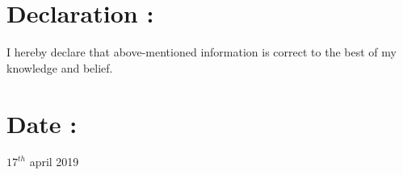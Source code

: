 \documentclass[a4paper, 12 pt]{article}
\begin{document}
\section*{Declaration :}
\hspace{1cm}I hereby declare that above-mentioned information is correct to the best of my \\
\hspace{1cm}knowledge and belief.
\section*{Date :}
\hspace{1cm}$17^{th}$ april 2019
\end{document}
